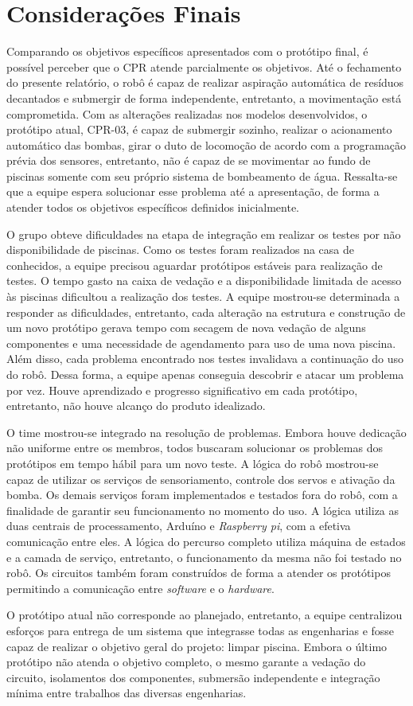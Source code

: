 \chapter{Considerações Finais}
Comparando os objetivos específicos apresentados com o protótipo final, é possível perceber que o CPR atende parcialmente os objetivos. Até o fechamento do presente relatório, o robô é capaz de realizar aspiração automática de resíduos decantados e submergir de forma independente, entretanto, a movimentação está comprometida. Com as alterações realizadas nos modelos desenvolvidos, o protótipo atual, CPR-03, é capaz de submergir sozinho, realizar o acionamento automático das bombas, girar o duto de locomoção de acordo com a programação prévia dos sensores, entretanto, não é capaz de se movimentar ao fundo de piscinas somente com seu próprio sistema de bombeamento de água. Ressalta-se que a equipe espera solucionar esse problema até a apresentação, de forma a atender todos os objetivos específicos definidos inicialmente.

O grupo obteve dificuldades na etapa de integração em realizar os testes por não disponibilidade de piscinas. Como os testes foram realizados na casa de conhecidos, a equipe precisou aguardar protótipos estáveis para realização de testes. O tempo gasto na caixa de vedação e a disponibilidade limitada de acesso às piscinas dificultou a realização dos testes. A equipe mostrou-se determinada a responder as dificuldades, entretanto, cada alteração na estrutura e construção de um novo protótipo gerava tempo com secagem de nova vedação de alguns componentes e uma necessidade de agendamento para uso de uma nova piscina. Além disso, cada problema encontrado nos testes invalidava a continuação do uso do robô. Dessa forma, a equipe apenas conseguia descobrir e atacar um problema por vez. Houve aprendizado e progresso significativo em cada protótipo, entretanto, não houve alcanço do produto idealizado.

O time mostrou-se integrado na resolução de problemas. Embora houve dedicação não uniforme entre os membros, todos buscaram solucionar os problemas dos protótipos em tempo hábil para um novo teste.
A lógica do robô mostrou-se capaz de utilizar os serviços de sensoriamento, controle dos servos e ativação da bomba. Os demais serviços foram implementados e testados fora do robô, com a finalidade de garantir seu funcionamento no momento do uso. A lógica utiliza as duas centrais de processamento, Arduíno e \textit{Raspberry pi}, com a efetiva comunicação entre eles. A lógica do percurso completo utiliza máquina de estados e a camada de serviço, entretanto, o funcionamento da mesma não foi testado no robô. Os circuitos também foram construídos de forma a atender os protótipos permitindo a comunicação entre \textit{software} e o \textit{hardware}.

O protótipo atual não corresponde ao planejado, entretanto, a equipe centralizou esforços para entrega de um sistema que integrasse todas as engenharias e fosse capaz de realizar o objetivo geral do projeto: limpar piscina. Embora o último protótipo não atenda o objetivo completo, o mesmo garante a vedação do circuito, isolamentos dos componentes, submersão independente e integração mínima entre trabalhos das diversas engenharias.